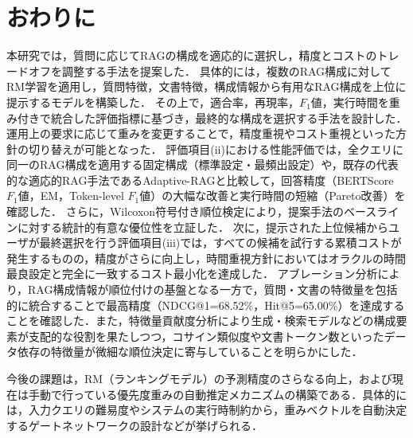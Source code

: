 \section{おわりに} \label{sec6}
本研究では，質問に応じてRAGの構成を適応的に選択し，精度とコストのトレードオフを調整する手法を提案した．
具体的には，複数のRAG構成に対してRM学習を適用し，質問特徴，文書特徴，構成情報から有用なRAG構成を上位に提示するモデルを構築した．
その上で，適合率，再現率，$F_1$値，実行時間を重み付きで統合した評価指標に基づき，最終的な構成を選択する手法を設計した．
運用上の要求に応じて重みを変更することで，精度重視やコスト重視といった方針の切り替えが可能となった．
評価項目(ii)における性能評価では，全クエリに同一のRAG構成を適用する固定構成（標準設定・最頻出設定）や，既存の代表的な適応的RAG手法であるAdaptive-RAGと比較して，回答精度（BERTScore $F_1$値，EM，Token-level $F_1$値）の大幅な改善と実行時間の短縮（Pareto改善）を確認した．
さらに，Wilcoxon符号付き順位検定により，提案手法のベースラインに対する統計的有意な優位性を立証した．
次に，提示された上位候補からユーザが最終選択を行う評価項目(iii)では，すべての候補を試行する累積コストが発生するものの，精度がさらに向上し，時間重視方針においてはオラクルの時間最良設定と完全に一致するコスト最小化を達成した．
アブレーション分析により，RAG構成情報が順位付けの基盤となる一方で，質問・文書の特徴量を包括的に統合することで最高精度（NDCG@1=68.52\%，Hit@5=65.00\%）を達成することを確認した．また，特徴量貢献度分析により生成・検索モデルなどの構成要素が支配的な役割を果たしつつ，コサイン類似度や文書トークン数といったデータ依存の特徴量が微細な順位決定に寄与していることを明らかにした．

今後の課題は，RM（ランキングモデル）の予測精度のさらなる向上，および現在は手動で行っている優先度重みの自動推定メカニズムの構築である．具体的には，入力クエリの難易度やシステムの実行時制約から，重みベクトルを自動決定するゲートネットワークの設計などが挙げられる．



